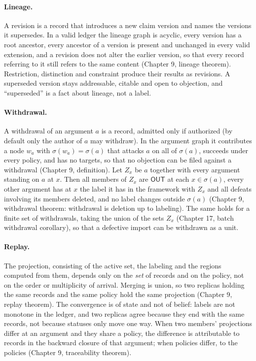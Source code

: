 \documentclass[11pt]{article}
\theoremstyle{plain}
\theoremstyle{definition}
\theoremstyle{remark}
\newcommand{\OUT}{\textsf{OUT}}
\begin{document}
\paragraph{Lineage.} A revision is a record that introduces a new claim version and names the versions it supersedes. In a valid ledger the lineage graph is acyclic, every version has a root ancestor, every ancestor of a version is present and unchanged in every valid extension, and a revision does not alter the earlier version, so that every record referring to it still refers to the same content (Chapter 9, lineage theorem). Restriction, distinction and constraint produce their results as revisions. A superseded version stays addressable, citable and open to objection, and ``superseded'' is a fact about lineage, not a label.

\paragraph{Withdrawal.} A withdrawal of an argument $a$ is a record, admitted only if authorized (by default only the author of $a$ may withdraw). In the argument graph it contributes a node $w_a$ with $\sigma(w_a)=\sigma(a)$ that attacks $a$ on all of $\sigma(a)$, succeeds under every policy, and has no targets, so that no objection can be filed against a withdrawal (Chapter 9, definition). Let $Z_x$ be $a$ together with every argument standing on $a$ at $x$. Then all members of $Z_x$ are $\OUT$ at each $x\in\sigma(a)$, every other argument has at $x$ the label it has in the framework with $Z_x$ and all defeats involving its members deleted, and no label changes outside $\sigma(a)$ (Chapter 9, withdrawal theorem: withdrawal is deletion up to labeling). The same holds for a finite set of withdrawals, taking the union of the sets $Z_x$ (Chapter 17, batch withdrawal corollary), so that a defective import can be withdrawn as a unit.

\paragraph{Replay.} The projection, consisting of the active set, the labeling and the regions computed from them, depends only on the \emph{set} of records and on the policy, not on the order or multiplicity of arrival. Merging is union, so two replicas holding the same records and the same policy hold the same projection (Chapter 9, replay theorem). The convergence is of state and not of belief: labels are not monotone in the ledger, and two replicas agree because they end with the same records, not because statuses only move one way. When two members' projections differ at an argument and they share a policy, the difference is attributable to records in the backward closure of that argument; when policies differ, to the policies (Chapter 9, traceability theorem).
\end{document}
